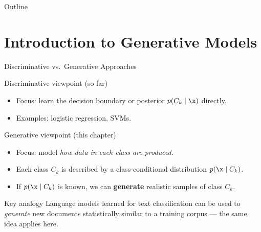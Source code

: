 \begin{frame}{Outline}
  \tableofcontents
\end{frame}

\section{Introduction to Generative Models}

\begin{frame}{Discriminative vs.\ Generative Approaches}
  \begin{block}{Discriminative viewpoint (so far)}
    \begin{itemize}
      \item Focus: learn the decision boundary or posterior $p(C_k\mid\x)$ directly.
      \item Examples: logistic regression, SVMs.
    \end{itemize}
  \end{block}

  \begin{alertblock}{Generative viewpoint (this chapter)}
    \begin{itemize}
      \item Focus: model \emph{how data in each class are produced}.
      \item Each class $C_k$ is described by a class-conditional distribution $p(\x\mid C_k)$.
      \item If $p(\x\mid C_k)$ is known, we can \textbf{generate} realistic samples of class $C_k$.
    \end{itemize}
  \end{alertblock}

  \begin{block}{Key analogy}
    Language models learned for text classification can be used to \emph{generate} new documents
    statistically similar to a training corpus — the same idea applies here.
  \end{block}
\end{frame}

